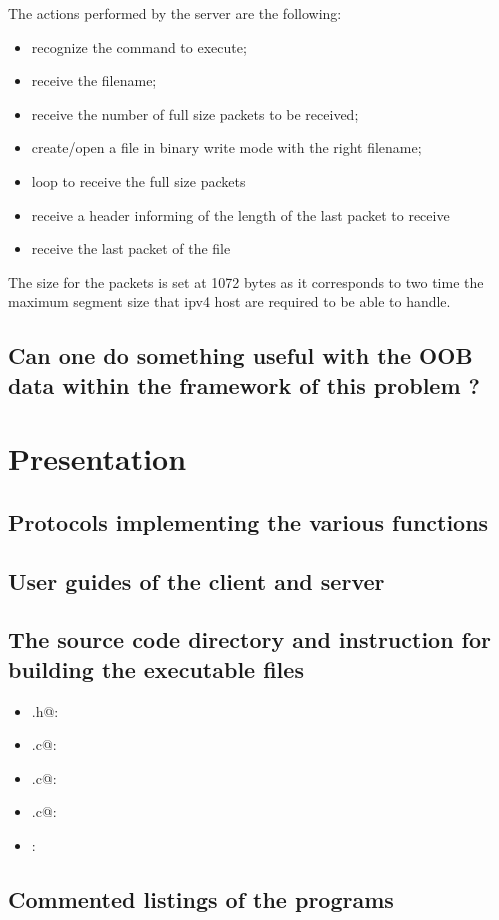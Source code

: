 \documentclass{article}
\begin{document}
The actions performed by the server are the following:
\begin{itemize}
    \item recognize the command to execute;
    \item receive the filename;
    \item receive the number of full size packets to be received;
    \item create/open a file in binary write mode with the right filename;
    \item loop to receive the full size packets
    \item receive a header informing of the length of the last packet to receive
    \item receive the last packet of the file
\end{itemize}

The size for the packets is set at 1072 bytes as it corresponds to two time the maximum segment size that ipv4 host are required to be able to handle.

\subsection{Can one do something useful with the OOB data within the framework of this problem ?}

\section{Presentation}
\subsection{Protocols implementing the various functions}
\subsection{User guides of the client and server}
\subsection{The source code directory and instruction for building the executable files}
\begin{itemize}
\item \verb@header.h@:
\item \verb@utils.c@:
\item \verb@myftp.c@:
\item \verb@myftpd.c@:
\item \verb@Makefile@:

\end{itemize}
\subsection{Commented listings of the programs}
\end{document}
